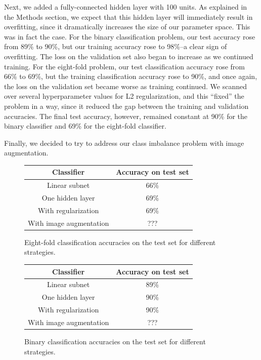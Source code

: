 \documentclass[10pt,twocolumn,letterpaper]{article}
\begin{document}
Next, we added a fully-connected hidden layer with 100 units. As explained in the Methods section, we expect that this hidden layer will immediately result in overfitting, since it dramatically increases the size of our parameter space. This was in fact the case. For the binary classification problem, our test accuracy rose from 89\% to 90\%, but our training accuracy rose to 98\%--a clear sign of overfitting. The loss on the validation set also began to increase as we continued training. For the eight-fold problem, our test classification accuracy rose from 66\% to 69\%, but the training classification accuracy rose to 90\%, and once again, the loss on the validation set became worse as training continued. We scanned over several hyperparameter values for L2 regularization, and this ``fixed'' the problem in a way, since it reduced the gap between the training and validation accuracies. The final test accuracy, however, remained constant at 90\% for the binary classifier and 69\% for the eight-fold classifier.

Finally, we decided to try to address our class imbalance problem with image augmentation.

\begin{figure}
\begin{center}
 \begin{tabular}{||c c||} 
 \hline
 Classifier & Accuracy on test set \\ [0.5ex] 
 \hline\hline
 Linear subnet & 66\% \\
 \hline
 One hidden layer & 69\% \\
 \hline
 With regularization & 69\% \\
 \hline
 With image augmentation & ??? \\
 \hline
\end{tabular}
\end{center}
\caption{Eight-fold classification accuracies on the test set for different strategies.}
\end{figure}

\begin{figure}
\begin{center}
 \begin{tabular}{||c c||} 
 \hline
 Classifier & Accuracy on test set \\ [0.5ex] 
 \hline\hline
 Linear subnet & 89\% \\
 \hline
 One hidden layer & 90\% \\
 \hline
 With regularization & 90\% \\
 \hline
 With image augmentation & ??? \\
 \hline
\end{tabular}
\end{center}
\caption{Binary classification accuracies on the test set for different strategies.}
\end{figure}
\end{document}
